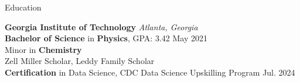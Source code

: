 \documentclass{resume} %
\begin{document}

\begin{rSection}{Education}

  {\bf Georgia Institute of Technology} \hfill {\em Atlanta, Georgia}
  \\ \textbf{Bachelor of Science} in \textbf{Physics}, GPA: 3.42 \hfill {May 2021}
  \\ Minor in \textbf{Chemistry}
  \\ Zell Miller Scholar, Leddy Family Scholar
  \\\textbf{Certification} in Data Science, CDC Data Science Upskilling Program \hfill {Jul. 2024}
\end{rSection}
\end{document}
